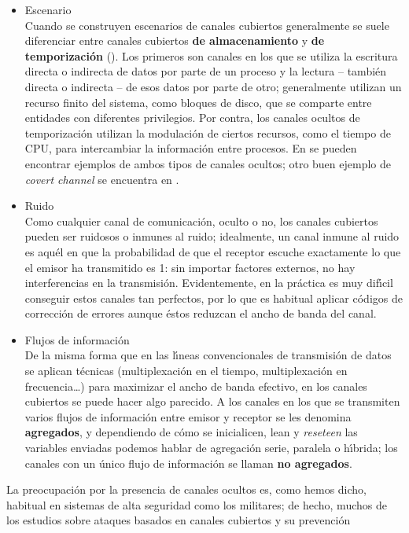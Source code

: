 \begin{itemize}	
\item Escenario\\
Cuando se construyen escenarios de canales cubiertos generalmente se suele
diferenciar entre canales cubiertos {\bf de almacenamiento} y {\bf de 
temporizaci\'on} (\cite{kn:lip75}). Los primeros son canales en los que se 
utiliza la escritura directa o indirecta de datos por parte de un proceso y la 
lectura -- tambi\'en directa o indirecta -- de esos datos por parte de otro;
generalmente utilizan un recurso finito del sistema, como bloques de disco, que
se comparte entre entidades con diferentes privilegios. Por contra, los 
canales ocultos de temporizaci\'on utilizan la modulaci\'on de ciertos recursos,
como el tiempo de CPU, para intercambiar la informaci\'on entre procesos. En
\cite{kn:gli93} se pueden encontrar ejemplos de ambos tipos de canales ocultos;
otro buen ejemplo de {\it covert channel} se encuentra en \cite{kn:mch95}.
\item Ruido\\
Como cualquier canal de comunicaci\'on, oculto o no, los canales cubiertos 
pueden ser ruidosos o inmunes al ruido; idealmente, un canal inmune al ruido es
aqu\'el en que la probabilidad de que el receptor escuche exactamente lo que
el emisor ha transmitido es 1: sin importar factores externos, no hay 
interferencias en la transmisi\'on. Evidentemente, en la pr\'actica es muy
dif\'{\i}cil conseguir estos canales tan perfectos, por lo que es habitual 
aplicar c\'odigos de correcci\'on de errores aunque \'estos reduzcan el ancho
de banda del canal. 
\item Flujos de informaci\'on\\
De la misma forma que en las l\'{\i}neas convencionales de transmisi\'on de 
datos se aplican t\'ecnicas (multiplexaci\'on en el tiempo, multiplexaci\'on en
frecuencia\ldots) para maximizar el ancho de banda efectivo, en los canales
cubiertos se puede hacer algo parecido. A los canales en los que se transmiten
varios flujos de informaci\'on entre emisor y receptor se les denomina {\bf
agregados}, y dependiendo de c\'omo se inicialicen, lean y {\it reseteen} las 
variables enviadas podemos hablar de agregaci\'on serie, paralela o 
h\'{\i}brida; los canales con un \'unico flujo de informaci\'on se llaman 
{\bf no agregados}.
\end{itemize}	
La preocupaci\'on por la presencia de canales ocultos es, como hemos dicho, 
habitual en sistemas de alta seguridad como los militares; de hecho, muchos
de los estudios sobre ataques basados en canales cubiertos y su prevenci\'on 
